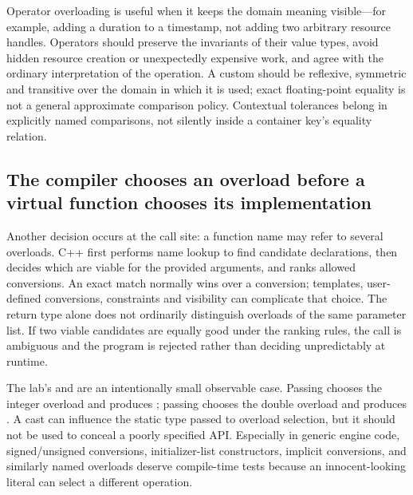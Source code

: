 Operator overloading is useful when it keeps the domain meaning visible---for example, adding a duration to a timestamp, not adding two arbitrary resource handles. Operators should preserve the invariants of their value types, avoid hidden resource creation or unexpectedly expensive work, and agree with the ordinary interpretation of the operation. A custom  should be reflexive, symmetric and transitive over the domain in which it is used; exact floating-point equality is not a general approximate comparison policy. Contextual tolerances belong in explicitly named comparisons, not silently inside a container key's equality relation.

\subsection{The compiler chooses an overload before a virtual function chooses its implementation}\label{05-engine-i-ch004-the-compiler-chooses-an-overload-before-a-virtual-function-chooses-its-implementation}

\hypertarget{05-engine-i-ch004-the-compiler-chooses-an-overload-before-a-virtual-function-chooses-its-implementation}{}

Another decision occurs at the call site: a function name may refer to several overloads. C++ first performs name lookup to find candidate declarations, then decides which are viable for the provided arguments, and ranks allowed conversions. An exact match normally wins over a conversion; templates, user-defined conversions, constraints and visibility can complicate that choice. The return type alone does not ordinarily distinguish overloads of the same parameter list. If two viable candidates are equally good under the ranking rules, the call is ambiguous and the program is rejected rather than deciding unpredictably at runtime.

The lab's  and  are an intentionally small observable case. Passing  chooses the integer overload and produces ; passing  chooses the double overload and produces . A cast can influence the static type passed to overload selection, but it should not be used to conceal a poorly specified API. Especially in generic engine code, signed/unsigned conversions, initializer-list constructors, implicit conversions, and similarly named overloads deserve compile-time tests because an innocent-looking literal can select a different operation.

